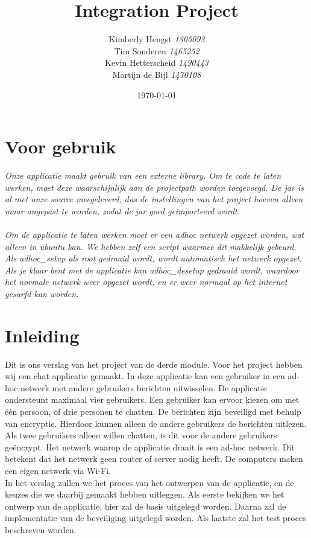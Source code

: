 \documentclass{article}
\title{Integration Project}
\author{Kimberly Hengst \emph{1305093}\\ Tim Sonderen \emph{1465252}\\ Kevin Hetterscheid \emph{1490443}\\ Martijn de Bijl \emph{1470108}}
\date{\today}
\begin{document}
\maketitle

\newpage

\section*{Voor gebruik}
\emph{Onze applicatie maakt gebruik van een externe library. Om te code te laten werken, moet deze waarschijnlijk aan de projectpath worden toegevoegd. De jar is al met onze source meegeleverd, dus de instellingen van het project hoeven alleen maar angepast te worden, zodat de jar goed geimporteerd wordt.\\
\phantom{YOLO} \\
Om de applicatie te laten werken moet er een adhoc netwerk opgezet worden, wat alleen in ubuntu kan. We hebben zelf een script waarmee dit makkelijk gebeurd. Als adhoc\_setup als root gedraaid wordt, wordt automatisch het netwerk opgezet. Als je klaar bent met de applicatie kan adhoc\_desetup gedraaid wordt, waardoor het normale netwerk weer opgezet wordt, en er weer normaal op het internet gesurfd kan worden.}

\newpage

\tableofcontents

\section{Inleiding}
Dit is ons verslag van het project van de derde module. Voor het project hebben wij een chat applicatie gemaakt. In deze applicatie kan een gebruiker in een ad-hoc netwerk met andere gebruikers berichten uitwisselen. De applicatie ondersteunt maximaal vier gebruikers. Een gebruiker kan ervoor kiezen om met één persoon, of drie personen te chatten. De berichten zijn beveiligd met behulp van encryptie. Hierdoor kunnen alleen de andere gebruikers de berichten uitlezen. Als twee gebruikers alleen willen chatten, is dit voor de andere gebruikers geëncrypt. Het netwerk waarop de applicatie draait is een ad-hoc netwerk. Dit betekent dat het netwerk geen router of server nodig heeft. De computers  maken een eigen netwerk via Wi-Fi.
\\
In het verslag zullen we het proces van het ontwerpen van de applicatie, en de keuzes die we daarbij gemaakt hebben uitleggen. Als eerste bekijken we het ontwerp van de applicatie, hier zal de basis uitgelegd worden. Daarna zal de implementatie van de beveiliging uitgelegd worden. Als laatste zal het test proces beschreven worden.
\end{document}

